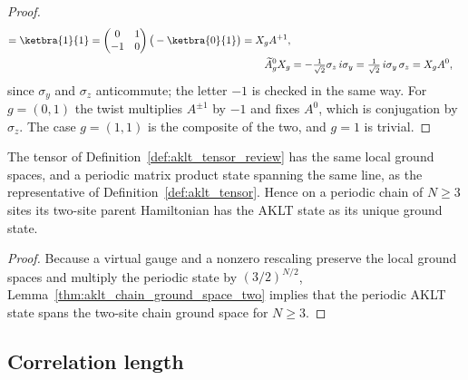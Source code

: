 \begin{proof}
\begin{align}
        = \ketbra{1}{1}
        = \begin{pmatrix}0&1\\-1&0\end{pmatrix}\big(-\ketbra{0}{1}\big)
        = X_g A^{+1},
        \notag                                                  \\
        \widetilde A_g^{0}X_g
         & = -\tfrac{1}{\sqrt2}\sigma_z\, i\sigma_y
        = \tfrac{1}{\sqrt2}\, i\sigma_y\,\sigma_z
        = X_g A^{0},
        \notag
    \end{align}
    since $\sigma_y$ and $\sigma_z$ anticommute; the letter $-1$ is checked in
    the same way. For $g=(0,1)$ the twist multiplies $A^{\pm1}$ by $-1$ and fixes
    $A^{0}$, which is conjugation by $\sigma_z$. The case $g=(1,1)$ is the
    composite of the two, and $g=1$ is trivial.
\end{proof}

\begin{lemma}%
    \label{thm:aklt_review_parent_hamiltonian}
    \leanok
    The tensor of Definition~\ref{def:aklt_tensor_review} has the same local
    ground spaces, and a periodic matrix product state spanning the same line,
    as the representative of Definition~\ref{def:aklt_tensor}. Hence on a
    periodic chain of $N\geq3$ sites its two-site parent Hamiltonian has the
    AKLT state as its unique ground state.
\end{lemma}
\begin{proof}
    \leanok
    Because a virtual gauge and a nonzero rescaling preserve the local ground
    spaces and multiply the periodic state by $(3/2)^{N/2}$,
    Lemma~\ref{thm:aklt_chain_ground_space_two} implies that the periodic
    AKLT state spans the two-site chain ground space for $N\geq3$.
\end{proof}

\subsection{Correlation length}\label{subsec:aklt_correlation_length}

